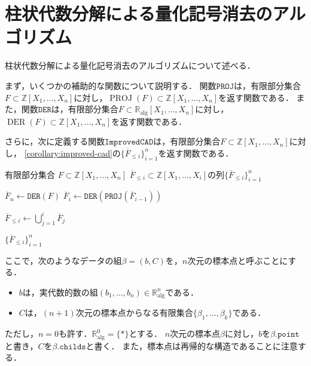 \documentclass[uplatex, dvipdfmx]{jsarticle}
\numberwithin{equation}{section}
\newcommand{\Ralg}{\mathbb{R}_\mathrm{alg}}
\newcommand{\Z}{\mathbb{Z}}
\DeclareMathOperator{\PROJ}{PROJ}
\DeclareMathOperator{\DER}{DER}
\theoremstyle{definition}
\begin{document}
\section{柱状代数分解による量化記号消去のアルゴリズム} \label{section:9}

柱状代数分解による量化記号消去のアルゴリズムについて述べる．

まず，いくつかの補助的な関数について説明する．
関数$\mathtt{PROJ}$は，有限部分集合$F \subset \Z[X_1, \dots, X_n]$に対し，$\PROJ(F) \subset \Z[X_1, \dots, X_n]$を返す関数である．
また，関数$\mathtt{DER}$は，有限部分集合$F \subset \Ralg[X_1, \dots, X_n]$に対し，$\DER(F) \subset \Z[X_1, \dots, X_n]$を返す関数である．

さらに，次に定義する関数$\mathtt{ImprovedCAD}$は，有限部分集合$F \subset \Z[X_1, \dots, X_n]$に対し，
\cref{corollary:improved-cad}の$\{\overline{F}_{\leq i}\}_{i=1}^n$を返す関数である．

\begin{algorithm}[H]
     \caption {$\mathtt{ImprovedCAD}(F)$}
     \begin{algorithmic}[1]
          \REQUIRE 
               有限部分集合
               $F \subset \Z[X_1, \dots, X_n]$
          \ENSURE 
               $ \overline{F}_{\leq i} \subset \Z[X_1, \dots, X_i]$の列$\{\overline{F}_{\leq i}\}_{i=1}^n$

                    \STATE $\overline{F}_n \leftarrow \mathtt{DER} (F)$
               \ELSE
                    \STATE $\overline{F}_i \leftarrow \mathtt{DER} (\mathtt{PROJ} (\overline{F}_{i-1}))$
               \ENDIF
          \ENDFOR

               \STATE $\overline{F}_{\leq i} \leftarrow \bigcup_{j=1}^i \overline{F}_j$
          \ENDFOR

          \RETURN $\{\overline{F}_{\leq i}\}_{i=1}^n$
     \end{algorithmic}

\end{algorithm}


ここで，次のようなデータの組$\beta = (b, C)$を，$n$次元の標本点と呼ぶことにする．
\begin{itemize}
     \item $b$は，実代数的数の組$(b_1, \dots, b_n) \in \Ralg^n$である．
     \item $C$は，$(n+1)$次元の標本点からなる有限集合$\{\beta_1, \dots, \beta_k\}$である．
\end{itemize}
ただし，$n=0$も許す．$\Ralg^0 = \{\mathord{*}\}$とする．
$n$次元の標本点$\beta$に対し，$b$を$\beta.\mathtt{point}$と書き，$C$を$\beta.\mathtt{childs}$と書く．
また，標本点は再帰的な構造であることに注意する．
\end{document}
